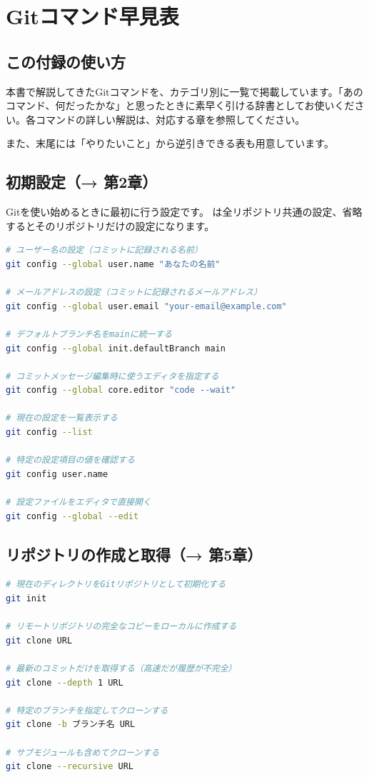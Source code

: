 \appendix

\chapter{Gitコマンド早見表}

\section*{この付録の使い方}

本書で解説してきたGitコマンドを、カテゴリ別に一覧で掲載しています。「あのコマンド、何だったかな」と思ったときに素早く引ける辞書としてお使いください。各コマンドの詳しい解説は、対応する章を参照してください。

また、末尾には「やりたいこと」から逆引きできる表も用意しています。

\section{初期設定（→ 第2章）}

Gitを使い始めるときに最初に行う設定です。 は全リポジトリ共通の設定、省略するとそのリポジトリだけの設定になります。

\begin{lstlisting}[language=bash]
# ユーザー名の設定（コミットに記録される名前）
git config --global user.name "あなたの名前"

# メールアドレスの設定（コミットに記録されるメールアドレス）
git config --global user.email "your-email@example.com"

# デフォルトブランチ名をmainに統一する
git config --global init.defaultBranch main

# コミットメッセージ編集時に使うエディタを指定する
git config --global core.editor "code --wait"

# 現在の設定を一覧表示する
git config --list

# 特定の設定項目の値を確認する
git config user.name

# 設定ファイルをエディタで直接開く
git config --global --edit
\end{lstlisting}

\section{リポジトリの作成と取得（→ 第5章）}

\begin{lstlisting}[language=bash]
# 現在のディレクトリをGitリポジトリとして初期化する
git init

# リモートリポジトリの完全なコピーをローカルに作成する
git clone URL

# 最新のコミットだけを取得する（高速だが履歴が不完全）
git clone --depth 1 URL

# 特定のブランチを指定してクローンする
git clone -b ブランチ名 URL

# サブモジュールも含めてクローンする
git clone --recursive URL
\end{lstlisting}


